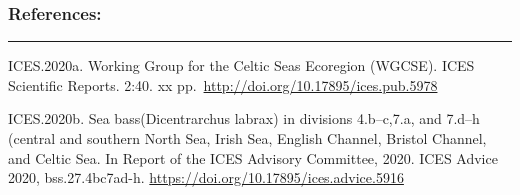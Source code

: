 \documentclass[
]{article}
\begin{document}
\hypertarget{references}{%
\subsubsection{\texorpdfstring{\textbf{References:}}{References:}}\label{references}}

\begin{center}\rule{0.5\linewidth}{0.5pt}\end{center}

ICES.2020a. Working Group for the Celtic Seas Ecoregion (WGCSE). ICES
Scientific Reports. 2:40. xx
pp.~\url{http://doi.org/10.17895/ices.pub.5978}

ICES.2020b. Sea bass(Dicentrarchus labrax) in divisions 4.b--c,7.a, and
7.d--h (central and southern North Sea, Irish Sea, English Channel,
Bristol Channel, and Celtic Sea. In Report of the ICES Advisory
Committee, 2020. ICES Advice 2020, bss.27.4bc7ad-h.
\url{https://doi.org/10.17895/ices.advice.5916}
\end{document}
